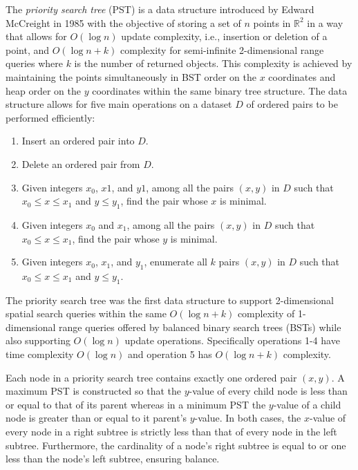 \documentclass{article}
\begin{document}
The {\em priority search tree} (PST) is a data structure introduced by Edward McCreight in 1985 with the objective of storing a set of $n$ points in $\mathbb{R}^2$ in a way that allows for $O(\log n)$ update complexity, i.e., insertion or deletion of a point, and $O(\log n + k)$ complexity for semi-infinite 2-dimensional range queries where $k$ is the number of returned objects. This complexity is achieved by maintaining the points simultaneously in BST order on the $x$ coordinates and heap order on the $y$ coordinates within the same binary tree structure. The data structure allows for five main operations on a dataset $D$ of ordered pairs to be performed efficiently:
\begin{enumerate}
\item Insert an ordered pair into $D$.
\item Delete an ordered pair from $D$.
\item Given integers $x_0$, $x1$, and $y1$, among all the pairs $(x, y)$ in $D$ such that $x_0 \leq x \leq x_1$ and $y \leq y_1$, find the pair whose $x$ is minimal.
\item Given integers $x_0$ and $x_1$, among all the pairs $(x, y)$ in $D$ such that $x_0 \leq x \leq x_1$, find the pair whose $y$ is minimal.
\item Given integers $x_0$, $x_1$, and $y_1$, enumerate all $k$ pairs $(x, y)$ in $D$ such that $x_0 \leq x \leq x_1$ and $y \leq y_1$.
\end{enumerate}
The priority search tree was the first data structure to support 2-dimensional spatial search queries within the same $O(\log n + k)$ complexity of 1-dimensional range queries offered by balanced binary search trees (BSTs) while also supporting $O(\log n)$ update operations. Specifically operations 1-4 have time complexity $O(\log n)$ and operation 5 has $O(\log n + k)$ complexity. 

Each node in a priority search tree contains exactly one ordered pair $(x, y)$. A maximum PST is constructed so that the $y$-value of every child node is less than or equal to that of its parent whereas in a minimum PST the $y$-value of a child node is greater than or equal to it parent's $y$-value. In both cases, the $x$-value of every node in a right subtree is strictly less than that of every node in the left subtree. Furthermore, the cardinality of a node’s right subtree is equal to or one less than the node’s left subtree, ensuring balance.  
\end{document}
